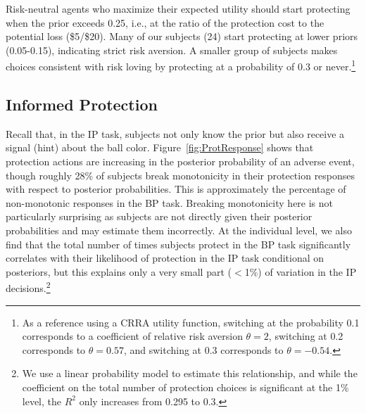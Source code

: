\documentclass[12pt,a4paper]{article}
\begin{document}

Risk-neutral agents who maximize their expected utility should start protecting when the prior exceeds 0.25, i.e., at the ratio of the protection cost to the potential loss (\$5/\$20). Many of our subjects (24) start protecting at lower priors (0.05-0.15), indicating strict risk aversion.  A smaller group of subjects makes choices consistent with risk loving by protecting at a probability of 0.3 or never.\footnote{As a reference using a CRRA utility function, switching at the probability 0.1 corresponds to a coefficient of relative risk aversion $\theta=2$, switching at 0.2 corresponds to $\theta=0.57$, and switching at 0.3 corresponds to $\theta=-0.54$.} 


\subsection{Informed Protection}

Recall that, in the IP task, subjects not only know the prior but also receive a signal (hint) about the ball color. 
Figure~\ref{fig:ProtResponse} shows that protection actions are increasing in the posterior probability of an adverse event, though roughly 28\% of subjects break monotonicity in their protection responses with respect to posterior probabilities. This is approximately the percentage of non-monotonic responses in the BP task.  Breaking monotonicity here is not particularly surprising as subjects are not directly given their posterior probabilities and may estimate them incorrectly. At the individual level, we also find that the total number of times subjects protect in the BP task significantly correlates with their likelihood of protection in the IP task conditional on posteriors, but this explains only a very small part ($<$1\%) of variation in the IP decisions.\footnote{We use a linear probability model to estimate this relationship, and while the coefficient on the total number of protection choices is significant at the 1\% level, the $R^2$ only increases from 0.295 to 0.3.} 


\end{document}
